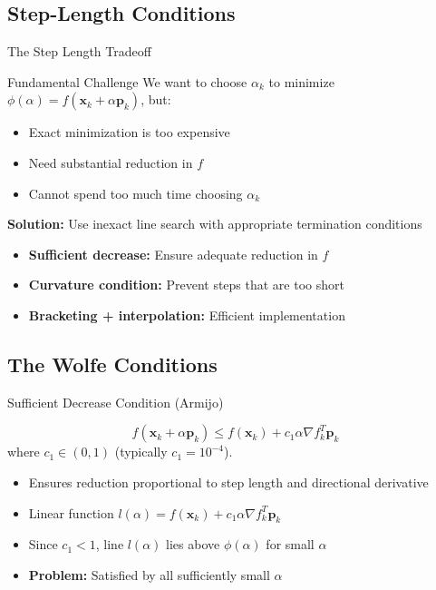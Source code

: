 \documentclass[aspectratio=1610]{beamer}
\begin{document}
\subsection{Step-Length Conditions}

\begin{frame}{The Step Length Tradeoff}
  \begin{block}{Fundamental Challenge}
    We want to choose $\alpha_k$ to minimize $\phi(\alpha) = f(\mathbf{x}_k + \alpha \mathbf{p}_k)$, but:
    \begin{itemize}
      \item Exact minimization is too expensive
      \item Need substantial reduction in $f$
      \item Cannot spend too much time choosing $\alpha_k$
    \end{itemize}
  \end{block}
  
  \vspace{0.3cm}
  
  \textbf{Solution:} Use inexact line search with appropriate termination conditions
  
  \vspace{0.3cm}
  
  \begin{itemize}
    \item \textbf{Sufficient decrease:} Ensure adequate reduction in $f$
    \item \textbf{Curvature condition:} Prevent steps that are too short
    \item \textbf{Bracketing + interpolation:} Efficient implementation
  \end{itemize}
\end{frame}

\subsection{The Wolfe Conditions}

\begin{frame}{Sufficient Decrease Condition (Armijo)}
  \begin{definition}
    $$f(\mathbf{x}_k + \alpha \mathbf{p}_k) \leq f(\mathbf{x}_k) + c_1 \alpha \nabla f_k^T \mathbf{p}_k$$
    where $c_1 \in (0,1)$ (typically $c_1 = 10^{-4}$).
  \end{definition}
  
  \vspace{0.3cm}
  
  \begin{itemize}
    \item Ensures reduction proportional to step length and directional derivative
    \item Linear function $l(\alpha) = f(\mathbf{x}_k) + c_1 \alpha \nabla f_k^T \mathbf{p}_k$
    \item Since $c_1 < 1$, line $l(\alpha)$ lies above $\phi(\alpha)$ for small $\alpha$
    \item \textbf{Problem:} Satisfied by all sufficiently small $\alpha$ 
  \end{itemize}
\end{frame}
\end{document}
